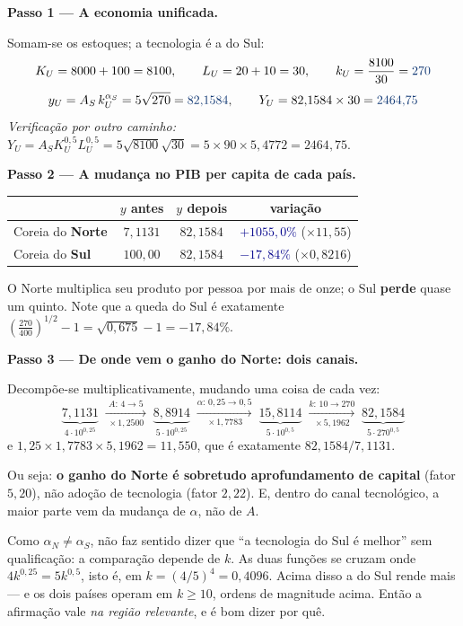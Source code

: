 \documentclass[11pt, a4paper]{article}
\newcommand{\passo}[1]{\medskip\noindent\textbf{#1}\par\nobreak}
\newcommand{\resp}[1]{%
  \ifmmode {\color{darkblue}#1}\else\textcolor{darkblue}{\textbf{#1}}\fi}
\begin{document}
\passo{Passo 1 --- A economia unificada.} Somam-se os estoques; a tecnologia é a do Sul:
$$K_U = 8000 + 100 = 8100, \qquad L_U = 20 + 10 = 30,
\qquad k_U = \frac{8100}{30} = \resp{270}$$
$$y_U = A_S\, k_U^{\alpha_S} = 5\sqrt{270} = \resp{82{,}1584},
\qquad Y_U = 82{,}1584 \times 30 = \resp{2464{,}75}$$
\emph{Verificação por outro caminho:} $Y_U = A_S K_U^{0{,}5} L_U^{0{,}5}
= 5\sqrt{8100}\sqrt{30} = 5 \times 90 \times 5{,}4772 = 2464{,}75$. \checkmark

\passo{Passo 2 --- A mudança no PIB per capita de cada país.}

\begin{center}
\small
\begin{tabular}{lccc}
\toprule
 & $y$ antes & $y$ depois & variação \\
\midrule
Coreia do \textbf{Norte} & $7{,}1131$ & $82{,}1584$
  & \resp{$+1055{,}0\%$} \; ($\times 11{,}55$) \\
Coreia do \textbf{Sul}   & $100{,}00$ & $82{,}1584$
  & \resp{$-17{,}84\%$} \; ($\times 0{,}8216$) \\
\bottomrule
\end{tabular}
\end{center}

O Norte multiplica seu produto por pessoa por mais de onze; o Sul \textbf{perde} quase um
quinto. Note que a queda do Sul é exatamente
$\left(\frac{270}{400}\right)^{1/2} - 1 = \sqrt{0{,}675}-1 = -17{,}84\%$.

\passo{Passo 3 --- De onde vem o ganho do Norte: dois canais.} Decompõe-se
multiplicativamente, mudando uma coisa de cada vez:
$$\underbrace{7{,}1131}_{4 \cdot 10^{0{,}25}}
\;\xrightarrow[\;\times 1{,}2500\;]{A:\,4\to5}\;
\underbrace{8{,}8914}_{5 \cdot 10^{0{,}25}}
\;\xrightarrow[\;\times 1{,}7783\;]{\alpha:\,0{,}25\to0{,}5}\;
\underbrace{15{,}8114}_{5 \cdot 10^{0{,}5}}
\;\xrightarrow[\;\times 5{,}1962\;]{k:\,10\to270}\;
\underbrace{82{,}1584}_{5 \cdot 270^{0{,}5}}$$
e $1{,}25 \times 1{,}7783 \times 5{,}1962 = 11{,}550$, que é exatamente
$82{,}1584/7{,}1131$. \checkmark

Ou seja: \textbf{o ganho do Norte é sobretudo aprofundamento de capital} (fator $5{,}20$),
não adoção de tecnologia (fator $2{,}22$). E, dentro do canal tecnológico, a maior parte
vem da mudança de $\alpha$, não de $A$.

\begin{tcolorbox}[theorybox, title={Uma ressalva honesta sobre comparar tecnologias com $\alpha$ diferente}]
\small
Como $\alpha_N \ne \alpha_S$, não faz sentido dizer que ``a tecnologia do Sul é melhor''
sem qualificação: a comparação depende de $k$. As duas funções se cruzam onde
$4k^{0{,}25} = 5k^{0{,}5}$, isto é, em $k = (4/5)^4 = 0{,}4096$. Acima disso a do Sul rende
mais --- e os dois países operam em $k \geq 10$, ordens de magnitude acima. Então a
afirmação vale \emph{na região relevante}, e é bom dizer por quê.
\end{tcolorbox}
\end{document}
